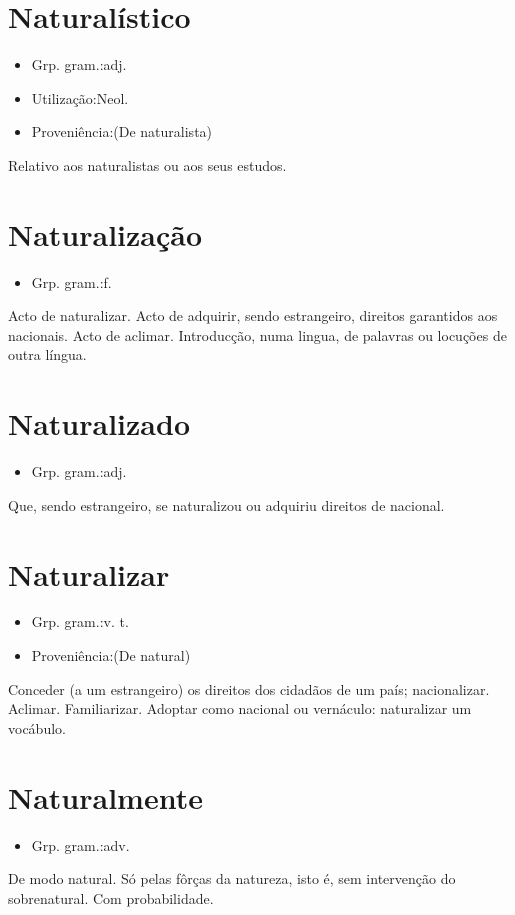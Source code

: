 \section{Naturalístico}
\begin{itemize}
\item {Grp. gram.:adj.}
\end{itemize}
\begin{itemize}
\item {Utilização:Neol.}
\end{itemize}
\begin{itemize}
\item {Proveniência:(De \textunderscore naturalista\textunderscore )}
\end{itemize}
Relativo aos naturalistas ou aos seus estudos.
\section{Naturalização}
\begin{itemize}
\item {Grp. gram.:f.}
\end{itemize}
Acto de naturalizar.
Acto de adquirir, sendo estrangeiro, direitos garantidos aos nacionais.
Acto de aclimar.
Introducção, numa lingua, de palavras ou locuções de outra língua.
\section{Naturalizado}
\begin{itemize}
\item {Grp. gram.:adj.}
\end{itemize}
Que, sendo estrangeiro, se naturalizou ou adquiriu direitos de nacional.
\section{Naturalizar}
\begin{itemize}
\item {Grp. gram.:v. t.}
\end{itemize}
\begin{itemize}
\item {Proveniência:(De \textunderscore natural\textunderscore )}
\end{itemize}
Conceder (a um estrangeiro) os direitos dos cidadãos de um país; nacionalizar.
Aclimar.
Familiarizar.
Adoptar como nacional ou vernáculo: \textunderscore naturalizar um vocábulo\textunderscore .
\section{Naturalmente}
\begin{itemize}
\item {Grp. gram.:adv.}
\end{itemize}
De modo natural.
Só pelas fôrças da natureza, isto é, sem intervenção do sobrenatural.
Com probabilidade.
